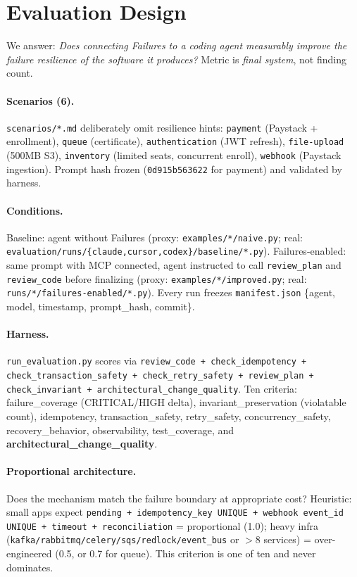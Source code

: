 \section{Evaluation Design}
We answer: \emph{Does connecting Failures to a coding agent measurably improve the failure resilience of the software it produces?} Metric is \emph{final system}, not finding count.

\paragraph{Scenarios (6).} \texttt{scenarios/*.md} deliberately omit resilience hints:
\texttt{payment} (Paystack + enrollment), \texttt{queue} (certificate), \texttt{authentication} (JWT refresh), \texttt{file-upload} (500MB S3), \texttt{inventory} (limited seats, concurrent enroll), \texttt{webhook} (Paystack ingestion). Prompt hash frozen (\texttt{0d915b563622} for payment) and validated by harness.

\paragraph{Conditions.} Baseline: agent without Failures (proxy: \texttt{examples/*/naive.py}; real: \texttt{evaluation/runs/\{claude,cursor,codex\}/baseline/*.py}). Failures-enabled: same prompt with MCP connected, agent instructed to call \texttt{review\_plan} and \texttt{review\_code} before finalizing (proxy: \texttt{examples/*/improved.py}; real: \texttt{runs/*/failures-enabled/*.py}). Every run freezes \texttt{manifest.json} \{agent, model, timestamp, prompt\_hash, commit\}.

\paragraph{Harness.} \texttt{run\_evaluation.py} scores via \texttt{review\_code + check\_idempotency + check\_transaction\_safety + check\_retry\_safety + review\_plan + check\_invariant + architectural\_change\_quality}. Ten criteria: failure\_coverage (CRITICAL/HIGH delta), invariant\_preservation (violatable count), idempotency, transaction\_safety, retry\_safety, concurrency\_safety, recovery\_behavior, observability, test\_coverage, and \textbf{architectural\_change\_quality}.

\paragraph{Proportional architecture.} Does the mechanism match the failure boundary at appropriate cost? Heuristic: small apps expect \texttt{pending + idempotency\_key UNIQUE + webhook event\_id UNIQUE + timeout + reconciliation} = proportional (1.0); heavy infra (\texttt{kafka/rabbitmq/celery/sqs/redlock/event\_bus} or $>$8 services) = over-engineered (0.5, or 0.7 for queue). This criterion is one of ten and never dominates.

